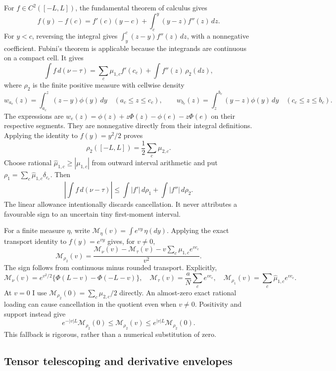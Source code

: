 For $f\in C^2([-L,L])$, the fundamental theorem of calculus gives
\[
 f(y)-f(c)=f'(c)(y-c)+\int_c^y(y-z)f''(z)\,dz.
\]
For $y<c$, reversing the integral gives
$\int_y^c(z-y)f''(z)\,dz$, with a nonnegative coefficient. Fubini's
theorem is applicable because the integrands are continuous on a compact
cell. It gives
\[
 \int f\,d(\nu-\tau)
 =\sum_c\mu_{1,c}f'(c_c)+\int f''(z)\,\rho_2(dz),
\]
where $\rho_2$ is the finite positive measure with cellwise density
\[
 w_{a_c}(z)=\int_{a_c}^{z}(z-y)\phi(y)\,dy
 \quad(a_c\leq z\leq c_c),\qquad
 w_{b_c}(z)=\int_z^{b_c}(y-z)\phi(y)\,dy
 \quad(c_c\leq z\leq b_c).
\]
The expressions are
$w_e(z)=\phi(z)+z\Phi(z)-\phi(e)-z\Phi(e)$ on their respective
segments. They are nonnegative directly from their integral definitions.
Applying the identity to $f(y)=y^2/2$ proves
\[
 \rho_2([-L,L])=\frac12\sum_c\mu_{2,c}.
\]
Choose rational $\widehat\mu_{1,c}\geq|\mu_{1,c}|$ from outward
interval arithmetic and put
$\rho_1=\sum_c\widehat\mu_{1,c}\delta_{c_c}$. Then
\[
 \left|\int f\,d(\nu-\tau)\right|
 \leq\int|f'|\,d\rho_1+\int|f''|\,d\rho_2.
\]
The linear allowance intentionally discards cancellation. It never
attributes a favourable sign to an uncertain tiny first-moment interval.

For a finite measure $\eta$, write
$\mathcal M_\eta(v)=\int e^{vy}\,\eta(dy)$. Applying the exact transport
identity to $f(y)=e^{vy}$ gives, for $v\ne0$,
\begin{equation}
 \mathcal M_{\rho_2}(v)=
 \frac{\mathcal M_\nu(v)-\mathcal M_\tau(v)
       -v\sum_c\mu_{1,c}e^{vc_c}}{v^2}.
 \label{supp:eq:positive-transport-mgf}
\end{equation}
The sign follows from continuous minus rounded transport. Explicitly,
\[
 \mathcal M_\nu(v)=e^{v^2/2}\{\Phi(L-v)-\Phi(-L-v)\},\quad
 \mathcal M_\tau(v)=\frac aN\sum_c e^{vc_c},\quad
 \mathcal M_{\rho_1}(v)=\sum_c\widehat\mu_{1,c}e^{vc_c}.
\]
At $v=0$ I use $\mathcal M_{\rho_2}(0)=\sum_c\mu_{2,c}/2$
directly. An almost-zero exact rational loading can cause cancellation
in the quotient even when $v\ne0$. Positivity and support instead give
\[
 e^{-|v|L}\mathcal M_{\rho_2}(0)
 \leq\mathcal M_{\rho_2}(v)
 \leq e^{|v|L}\mathcal M_{\rho_2}(0).
\]
This fallback is rigorous, rather than a numerical substitution of zero.

\subsection{Tensor telescoping and derivative envelopes}

